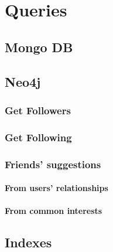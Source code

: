 \chapter{Queries}
\section{Mongo DB}
\section{Neo4j}
\subsection{Get Followers}
\subsection{Get Following}
\subsection{Friends' suggestions}
\subsubsection{From users' relationships}
\subsubsection{From common interests}
\section{Indexes}
